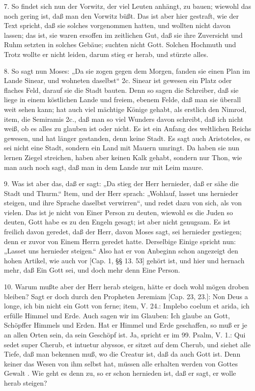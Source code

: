 7. So findet sich nun der Vorwitz, der viel Leuten anhängt, zu bauen; wiewohl das noch gering ist, daß man den Vorwitz büßt. Das ist aber hier gestraft, wie der Text spricht, daß sie solches vorgenommen hatten, und wollten nicht davon lassen; das ist, sie waren ersoffen im zeitlichen Gut, daß sie ihre Zuversicht und Ruhm setzten in solches Gebäue; suchten nicht Gott. Solchen Hochmuth und Trotz wollte er nicht leiden, darum stieg er herab, und stürzte alles.

8. So sagt nun Moses: „Da sie zogen gegen dem Morgen, fanden sie einen Plan im Lande Sinear, und wohneten daselbst“ 2c. Sinear ist gewesen ein Platz oder flaches Feld, darauf sie die Stadt bauten. Denn so sagen die Schreiber, daß sie liege in einem köstlichen Lande und freiem, ebenem Felde, daß man sie überall weit sehen kann; hat auch viel mächtige Könige gehabt, als erstlich den Nimrod, item, die Semiramis 2c., daß man so viel Wunders davon schreibt, daß ich nicht weiß, ob es alles zu glauben ist oder nicht. Es ist ein Anfang des weltlichen Reichs gewesen, und hat länger gestanden, denn keine Stadt. Es sagt auch Aristoteles, es sei nicht eine Stadt, sondern ein Land mit Mauern umringt. Da haben sie nun lernen Ziegel streichen, haben aber keinen Kalk gehabt, sondern nur Thon, wie man auch noch sagt, daß man in dem Lande nur mit Leim maure.

9. Was ist aber das, daß er sagt: „Da stieg der Herr hernieder, daß er sähe die Stadt und Thurm.“ Item, und der Herr sprach: „Wohlauf, lasset uns hernieder steigen, und ihre Sprache daselbst verwirren“, und redet dazu von sich, als von vielen. Das ist je nicht von Einer Person zu deuten, wiewohl es die Juden so deuten, Gott habe es zu den Engeln gesagt; ist aber nicht genugsam. Es ist freilich davon geredet, daß der Herr, davon Moses sagt, sei hernieder gestiegen; denn er zuvor von Einem Herrn geredet hatte. Derselbige Einige spricht nun: „Lasset uns hernieder steigen.“ Also hat er von Anbeginn schon angezeigt den hohen Artikel, wie auch vor [Cap. 1, §§ 13. 53] gehört ist, und hier und hernach mehr, daß Ein Gott sei, und doch mehr denn Eine Person.

10. Warum mußte aber der Herr herab steigen, hätte er doch wohl mögen droben bleiben? Sagt er doch durch den Propheten Jeremiam [Cap. 23, 23.]: Non Deus a longe, ich bin nicht ein Gott von ferne; item, V. 24.: Implebo coelum et arida, ich erfülle Himmel und Erde. Auch sagen wir im Glauben: Ich glaube an Gott, Schöpffer Himmels und Erden. Hat er Himmel und Erde geschaffen, so muß er je an allen Orten sein, da sein Geschöpf ist. Ja, spricht er im 99. Psalm, V. 1.: Qui sedet super Cherub, et intuetur abyssos, er sitzet auf dem Cherub, und siehet alle Tiefe, daß man bekennen muß, wo die Creatur ist, daß da auch Gott ist. Denn keiner das Wesen von ihm selbst hat, müssen alle erhalten werden von Gottes Gewalt
. Wie geht es denn zu, so er schon hernieden ist, daß er sagt, er wolle herab steigen?

